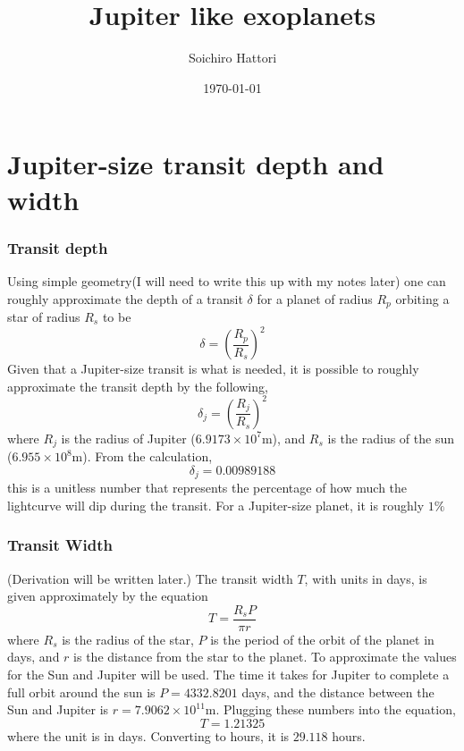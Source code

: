 \documentclass[a4paper]{article}
\title{Jupiter like exoplanets}
\author{Soichiro Hattori}
\date{\today}
\begin{document}
\maketitle

\section{Jupiter-size transit depth and width}
\subsubsection*{Transit depth}
Using simple geometry(I will need to write this up with my notes later) one can roughly approximate the depth of a transit $\delta$ for a planet of radius $R_p$ orbiting a star of radius $R_s$ to be $$\delta=(\frac{R_p}{R_s})^2$$
Given that a Jupiter-size transit is what is needed, it is possible to roughly approximate the transit depth by the following, $$\delta_j=(\frac{R_j}{R_s})^2$$ where $R_j$ is the radius of Jupiter ($6.9173\times10^7$m), and $R_s$ is the radius of the sun ($6.955\times10^8$m). From the calculation, $$\delta_j=0.00989188$$
this is a unitless number that represents the percentage of how much the lightcurve will dip during the transit. For a Jupiter-size planet, it is roughly $1\%$

\subsubsection*{Transit Width}
(Derivation will be written later.)
The transit width $T$, with units in days, is given approximately by the equation $$T=\frac{R_sP}{\pi r}$$ where $R_s$ is the radius of the star, $P$ is the period of the orbit of the planet in days, and $r$ is the distance from the star to the planet. To approximate the values for the Sun and Jupiter will be used. The time it takes for Jupiter to complete a full orbit around the sun is $P=4332.8201$ days, and the distance between the Sun and Jupiter is $r=7.9062\times10^{11}$m. Plugging these numbers into the equation,  $$T=1.21325$$ where the unit is in days. Converting to hours, it is $29.118$ hours.
\end{document}
